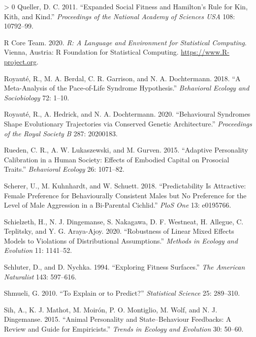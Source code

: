 \documentclass{article}
\newlength{\cslhangindent}
\newenvironment{CSLReferences}[3] %
 {%
  \setlength{\parindent}{0pt}
  \ifodd #1 \everypar{\setlength{\hangindent}{\cslhangindent}}\ignorespaces\fi
  \ifnum #2 > 0
  \setlength{\parskip}{#2\baselineskip}
  \fi
 }%
 {}
\begin{document}
\begin{CSLReferences}{1}{0}
\leavevmode\hypertarget{ref-Queller2011}{}%
Queller, D. C. 2011. {``Expanded Social Fitness and Hamilton's Rule for
Kin, Kith, and Kind.''} \emph{Proceedings of the National Academy of
Sciences USA} 108: 10792--99.

\leavevmode\hypertarget{ref-Rbase}{}%
R Core Team. 2020. \emph{R: A Language and Environment for Statistical
Computing}. Vienna, Austria: R Foundation for Statistical Computing.
\url{https://www.R-project.org}.

\leavevmode\hypertarget{ref-Roy2018}{}%
Royauté, R., M. A. Berdal, C. R. Garrison, and N. A. Dochtermann. 2018.
{``A Meta-Analysis of the Pace-of-Life Syndrome Hypothesis.''}
\emph{Behavioral Ecology and Sociobiology} 72: 1--10.

\leavevmode\hypertarget{ref-Roy2020}{}%
Royauté, R., A. Hedrick, and N. A. Dochtermann. 2020. {``Behavioural
Syndromes Shape Evolutionary Trajectories via Conserved Genetic
Architecture.''} \emph{Proceedings of the Royal Society B} 287:
20200183.

\leavevmode\hypertarget{ref-Rueden2015}{}%
Rueden, C. R., A. W. Lukaszewski, and M. Gurven. 2015. {``Adaptive
Personality Calibration in a Human Society: Effects of Embodied Capital
on Prosocial Traits.''} \emph{Behavioral Ecology} 26: 1071--82.

\leavevmode\hypertarget{ref-Scherer2018}{}%
Scherer, U., M. Kuhnhardt, and W. Schuett. 2018. {``Predictability Is
Attractive: Female Preference for Behaviourally Consistent Males but No
Preference for the Level of Male Aggression in a Bi-Parental Cichlid.''}
\emph{PloS One} 13: e0195766.

\leavevmode\hypertarget{ref-Schiel2020}{}%
Schielzeth, H., N. J. Dingemanse, S. Nakagawa, D. F. Westneat, H.
Allegue, C. Teplitsky, and Y. G. Araya-Ajoy. 2020. {``Robustness of
Linear Mixed Effects Models to Violations of Distributional
Assumptions.''} \emph{Methods in Ecology and Evolution} 11: 1141--52.

\leavevmode\hypertarget{ref-Schluter1994}{}%
Schluter, D., and D. Nychka. 1994. {``Exploring Fitness Surfaces.''}
\emph{The American Naturalist} 143: 597--616.

\leavevmode\hypertarget{ref-Shmueli2010}{}%
Shmueli, G. 2010. {``To Explain or to Predict?''} \emph{Statistical
Science} 25: 289--310.

\leavevmode\hypertarget{ref-Sih2015}{}%
Sih, A., K. J. Mathot, M. Moirón, P. O. Montiglio, M. Wolf, and N. J.
Dingemanse. 2015. {``Animal Personality and State--Behaviour Feedbacks:
A Review and Guide for Empiricists.''} \emph{Trends in Ecology and
Evolution} 30: 50--60.


\end{CSLReferences}
\end{document}
